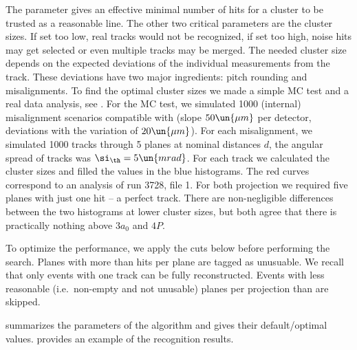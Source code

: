 The  parameter gives an effective minimal number of hits for a cluster to be trusted as a reasonable line. The other two critical parameters are the cluster sizes. If set too low, real tracks would not be recognized, if set too high, noise hits may get selected or even multiple tracks may be merged. The needed cluster size depends on the expected deviations of the individual measurements from the track. These deviations have two major ingredients: pitch rounding and misalignments. To find the optimal cluster sizes we made a simple MC test and a real data analysis, see . For the MC test, we simulated  1000 (internal) misalignment scenarios compatible with  (slope $50\un{\mu m}$ per detector, deviations with the variation of $20\un{\mu m}$). For each misalignment, we simulated 1000 tracks through 5 planes at nominal distances $d$, the angular spread of tracks was $\si_\th = 5\un{mrad}$. For each track we calculated the cluster sizes and filled the values in the blue histograms. The red curves correspond to an analysis of run 3728, file 1. For both projection we required five planes with just one hit -- a perfect track. There are non-negligible differences between the two histograms at lower cluster sizes, but both agree that there is practically nothing above $3a_0$ and $4P$.


To optimize the performance, we apply the cuts below before performing the search.
\bitm
\itm Planes with more than  hits per plane are tagged as unusuable. We recall that only events with one track can be fully reconstructed.
\itm Events with less reasonable (i.e.~non-empty and not unusable) planes per projection than\break {} are skipped.
\eitm

 summarizes the parameters of the algorithm and gives their default/optimal values.  provides an example of the recognition results.




